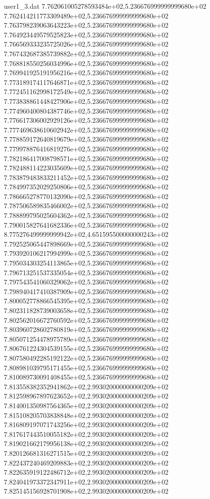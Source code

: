 \begin{filecontents}{user1_3.dat}
7.762061005278593484e+02,5.236676999999999680e+02
7.762414211773309489e+02,5.236676999999999680e+02
7.763798239063643223e+02,5.236676999999999680e+02
7.764923449579525823e+02,5.236676999999999680e+02
7.766569333235725026e+02,5.236676999999999680e+02
7.767432687385739882e+02,5.236676999999999680e+02
7.768818550256034996e+02,5.236676999999999680e+02
7.769941925191956216e+02,5.236676999999999680e+02
7.773189174117646871e+02,5.236676999999999680e+02
7.772451162998172549e+02,5.236676999999999680e+02
7.773838861448427906e+02,5.236676999999999680e+02
7.774960400804387746e+02,5.236676999999999680e+02
7.776617306002929126e+02,5.236676999999999680e+02
7.777469638610602942e+02,5.236676999999999680e+02
7.778859172640819679e+02,5.236676999999999680e+02
7.779978876416819276e+02,5.236676999999999680e+02
7.782186417008798571e+02,5.236676999999999680e+02
7.782488114223035609e+02,5.236676999999999680e+02
7.783879483833211452e+02,5.236676999999999680e+02
7.784997352029250806e+02,5.236676999999999680e+02
7.786665278770132090e+02,5.236676999999999680e+02
7.787506589835466002e+02,5.236676999999999680e+02
7.788899795025604362e+02,5.236676999999999680e+02
7.790015827641682336e+02,5.236676999999999680e+02
8.775276499999999942e+02,4.651595500000000243e+02
7.792525065447898669e+02,5.236676999999999680e+02
7.793920106217994999e+02,5.236676999999999680e+02
7.795034303254113865e+02,5.236676999999999680e+02
7.796713251537335054e+02,5.236676999999999680e+02
7.797543541060329062e+02,5.236676999999999680e+02
7.798940417410387909e+02,5.236676999999999680e+02
7.800052778866545395e+02,5.236676999999999680e+02
7.802311828739003658e+02,5.236676999999999680e+02
7.802562016672760592e+02,5.236676999999999680e+02
7.803960728602780819e+02,5.236676999999999680e+02
7.805071254478975789e+02,5.236676999999999680e+02
7.806761224304539155e+02,5.236676999999999680e+02
7.807580492285192122e+02,5.236676999999999680e+02
7.808981039795171455e+02,5.236676999999999680e+02
7.810089730091408455e+02,5.236676999999999680e+02
7.813558382352941862e+02,2.993020000000000209e+02
7.812598967897623652e+02,2.993020000000000209e+02
7.814001350987564365e+02,2.993020000000000209e+02
7.815108205703838848e+02,2.993020000000000209e+02
7.816809197071743256e+02,2.993020000000000209e+02
7.817617443510055182e+02,2.993020000000000209e+02
7.819021662179956138e+02,2.993020000000000209e+02
7.820126681316271515e+02,2.993020000000000209e+02
7.822437240469209883e+02,2.993020000000000209e+02
7.822635919122486712e+02,2.993020000000000209e+02
7.824041973372347911e+02,2.993020000000000209e+02
7.825145156928701908e+02,2.993020000000000209e+02

\end{filecontents}
